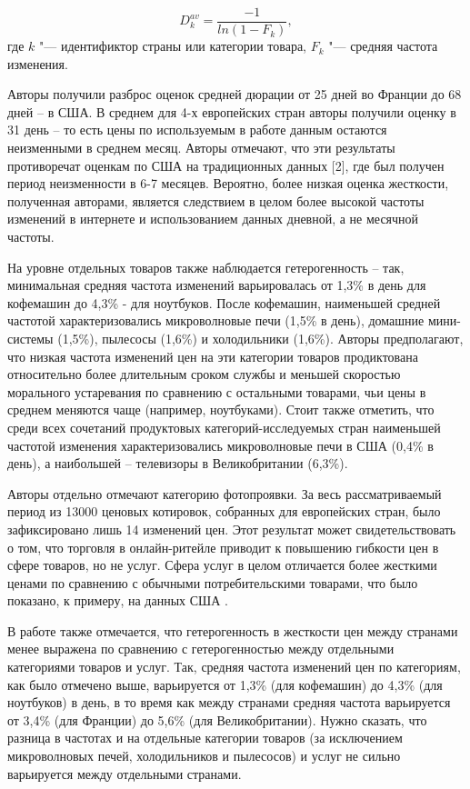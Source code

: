 \begin{equation}
	\label{eq:equation1}
	D_k^{av}=\frac{-1}{ln⁡(1-F_k)},
\end{equation}
где \( k \) "--- идентификтор страны или категории товара, \( F_k \) "--- средняя частота изменения.

Авторы получили разброс оценок средней дюрации от 25 дней во Франции до 68 дней – в США. В среднем для 4-х европейских стран авторы получили оценку в 31 день – то есть цены по используемым в работе данным остаются неизменными в среднем месяц. Авторы отмечают, что эти результаты противоречат оценкам по США на традиционных данных [2], где был получен период неизменности в 6-7 месяцев. Вероятно, более низкая оценка жесткости, полученная авторами, является следствием в целом более высокой частоты изменений в интернете и использованием данных дневной, а не месячной частоты.

На уровне отдельных товаров также наблюдается гетерогенность – так, минимальная средняя частота изменений варьировалась от 1,3\% в день для кофемашин до 4,3\% - для ноутбуков. После кофемашин, наименьшей средней частотой характеризовались микроволновые печи (1,5\% в день), домашние мини-системы (1,5\%), пылесосы (1,6\%) и холодильники (1,6\%). Авторы предполагают, что низкая частота изменений цен на эти категории товаров продиктована относительно более длительным сроком службы и меньшей скоростью морального устаревания по сравнению с остальными товарами, чьи цены в среднем меняются чаще (например, ноутбуками). Стоит также отметить, что среди всех сочетаний продуктовых категорий-исследуемых стран наименьшей частотой изменения характеризовались микроволновые печи в США (0,4\% в день), а наибольшей – телевизоры в Великобритании (6,3\%).

Авторы отдельно отмечают категорию фотопроявки. За весь рассматриваемый период из 13000 ценовых котировок, собранных для европейских стран, было зафиксировано лишь 14 изменений цен. Этот результат может свидетельствовать о том, что торговля в онлайн-ритейле приводит к повышению гибкости цен в сфере товаров, но не услуг. Сфера услуг в целом отличается более жесткими ценами по сравнению с обычными потребительскими товарами, что было показано, к примеру, на данных США \cite{bils2004some}.

В работе также отмечается, что гетерогенность в жесткости цен между странами менее выражена по сравнению с гетерогенностью между отдельными категориями товаров и услуг. Так, средняя частота изменений цен по категориям, как было отмечено выше, варьируется от 1,3\% (для кофемашин) до 4,3\% (для ноутбуков) в день, в то время как между странами средняя частота варьируется от 3,4\% (для Франции) до 5,6\% (для Великобритании). Нужно сказать, что разница в частотах и на отдельные категории товаров (за исключением микроволновых печей, холодильников и пылесосов) и услуг не сильно варьируется между отдельными странами. 

